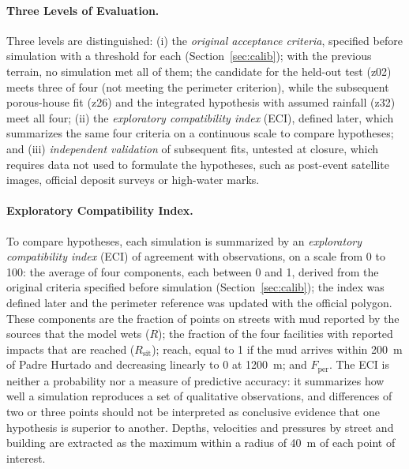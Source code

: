 \paragraph{Three Levels of Evaluation.} Three levels are distinguished: (i) the \emph{original acceptance criteria}, specified before simulation with a threshold for each (Section~\ref{sec:calib}); with the previous terrain, no simulation met all of them; the candidate for the held-out test (z02) meets three of four (not meeting the perimeter criterion), while the subsequent porous-house fit (z26) and the integrated hypothesis with assumed rainfall (z32) meet all four; (ii) the \emph{exploratory compatibility index} (ECI), defined later, which summarizes the same four criteria on a continuous scale to compare hypotheses; and (iii) \emph{independent validation} of subsequent fits, untested at closure, which requires data not used to formulate the hypotheses, such as post-event satellite images, official deposit surveys or high-water marks.

\paragraph{Exploratory Compatibility Index.} To compare hypotheses, each simulation is summarized by an \emph{exploratory compatibility index} (ECI) of agreement with observations, on a scale from 0 to 100: the average of four components, each between 0 and 1, derived from the original criteria specified before simulation (Section~\ref{sec:calib}); the index was defined later and the perimeter reference was updated with the official polygon. These components are the fraction of points on streets with mud reported by the sources that the model wets ($R$); the fraction of the four facilities with reported impacts that are reached ($R_\mathrm{sit}$); reach, equal to 1 if the mud arrives within \SI{200}{m} of Padre Hurtado and decreasing linearly to 0 at \SI{1200}{m}; and $F_\mathrm{per}$. The ECI is neither a probability nor a measure of predictive accuracy: it summarizes how well a simulation reproduces a set of qualitative observations, and differences of two or three points should not be interpreted as conclusive evidence that one hypothesis is superior to another. Depths, velocities and pressures by street and building are extracted as the maximum within a radius of \SI{40}{m} of each point of interest.
